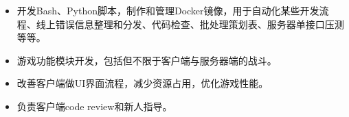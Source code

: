 \documentclass[letterpaper]{article}
\begin{document}
\begin{itemize}
\begin{itemize}
\begin{itemize}
                    \item 开发Bash、Python脚本，制作和管理Docker镜像，用于自动化某些开发流程、线上错误信息整理和分发、代码检查、批处理策划表、服务器单接口压测等等。
                    \item 游戏功能模块开发，包括但不限于客户端与服务器端的战斗。
                    \item 改善客户端做UI界面流程，减少资源占用，优化游戏性能。
                    \item 负责客户端code review和新人指导。
                \end{itemize}
        \end{itemize}
\end{itemize}
\end{document}
